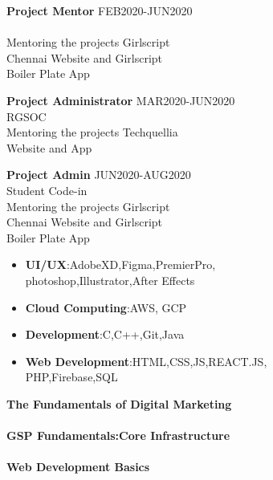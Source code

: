 \documentclass[10pt,a4paper,ragged2e]{altacv}
\begin{document}

\smallskip

\textbf{Project Mentor} \hspace{5.5em} {\tiny FEB2020-JUN2020}\\\medskip
{}\\\smallskip
{Mentoring the projects Girlscript}\\\smallskip
{Chennai Website and Girlscript}\\\smallskip
{Boiler Plate App}\\\bigskip

\textbf{Project Administrator} \hspace{2.5em} {\tiny MAR2020-JUN2020}\\\medskip
{RGSOC}\\\smallskip
{Mentoring the projects Techquellia}\\\smallskip
{Website and App}\\\bigskip

\textbf{Project Admin} \hspace{6em} {\tiny JUN2020-AUG2020}\\\medskip
{Student Code-in}\\\smallskip
{Mentoring the projects Girlscript}\\\smallskip
{Chennai Website and Girlscript}\\\smallskip
{Boiler Plate App}\\\bigskip



\smallskip
\begin{itemize}
\item \textbf{UI/UX}:AdobeXD,Figma,PremierPro,\\\smallskip
photoshop,Illustrator,After Effects
\smallskip
\item \textbf{Cloud Computing}:AWS, GCP
\item\textbf{Development}:C,C++,Git,Java
\item\textbf{Web Development}:HTML,CSS,JS,REACT.JS,\\\smallskip
PHP,Firebase,SQL


\end{itemize}

\smallskip
\textbf{\small{The Fundamentals of Digital Marketing}}\\\smallskip
{}\\\smallskip
\textbf{\small{GSP Fundamentals:Core Infrastructure}}\\\smallskip
{}\\\smallskip
\textbf{\small{Web Development Basics}}\\\smallskip
{}





\clearpage


\nocite{*}
\end{document}
